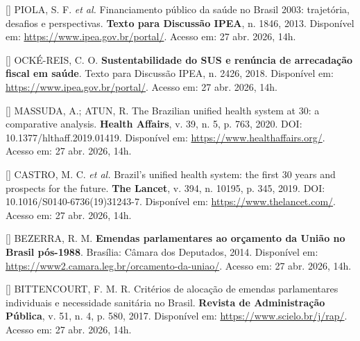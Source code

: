 \documentclass[12pt,a4paper,oneside]{article}
\begin{document}
\begin{singlespace}
\noindent\hangindent=1.25cm
[\thebibctr] PIOLA, S. F. \textit{et al.} Financiamento público da saúde no
Brasil 2003: trajetória, desafios e perspectivas.
\textbf{Texto para Discussão IPEA}, n. 1846, 2013. Disponível em:
\url{https://www.ipea.gov.br/portal/}. Acesso em: 27 abr. 2026,
14h.\label{ref:piola}\par\smallskip

\noindent\hangindent=1.25cm
[\thebibctr] OCKÉ-REIS, C. O. \textbf{Sustentabilidade do SUS e renúncia de
arrecadação fiscal em saúde}. Texto para Discussão IPEA, n. 2426,
2018. Disponível em: \url{https://www.ipea.gov.br/portal/}.
Acesso em: 27 abr. 2026, 14h.\label{ref:ocke-reis}\par\smallskip

\noindent\hangindent=1.25cm
[\thebibctr] MASSUDA, A.; ATUN, R. The Brazilian unified health system at 30:
a comparative analysis. \textbf{Health Affairs}, v. 39, n. 5,
p. 763, 2020. DOI: 10.1377/hlthaff.2019.01419.
Disponível em: \url{https://www.healthaffairs.org/}. Acesso em:
27 abr. 2026, 14h.\label{ref:massuda}\par\smallskip

\noindent\hangindent=1.25cm
[\thebibctr] CASTRO, M. C. \textit{et al.} Brazil's unified health system: the
first 30 years and prospects for the future. \textbf{The Lancet},
v. 394, n. 10195, p. 345, 2019. DOI:
10.1016/S0140-6736(19)31243-7. Disponível em:
\url{https://www.thelancet.com/}. Acesso em: 27 abr. 2026,
14h.\label{ref:castro}\par\smallskip

\noindent\hangindent=1.25cm
[\thebibctr] BEZERRA, R. M. \textbf{Emendas parlamentares ao orçamento da União
no Brasil pós-1988}. Brasília: Câmara dos Deputados, 2014.
Disponível em: \url{https://www2.camara.leg.br/orcamento-da-uniao/}.
Acesso em: 27 abr. 2026, 14h.\label{ref:bezerra}\par\smallskip

\noindent\hangindent=1.25cm
[\thebibctr] BITTENCOURT, F. M. R. Critérios de alocação de emendas
parlamentares individuais e necessidade sanitária no Brasil.
\textbf{Revista de Administração Pública}, v. 51, n. 4,
p. 580, 2017. Disponível em:
\url{https://www.scielo.br/j/rap/}. Acesso em: 27 abr. 2026,
14h.\label{ref:bittencourt}\par\smallskip


\end{singlespace}
\end{document}
